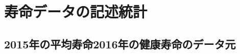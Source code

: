 %
%
%
%
%
%
%
%






%
%
%
%
%
%
%
%
%
%
%
%
%
%
%




\chapter{寿命データの記述統計}

\section{2015年の平均寿命2016年の健康寿命のデータ元}


